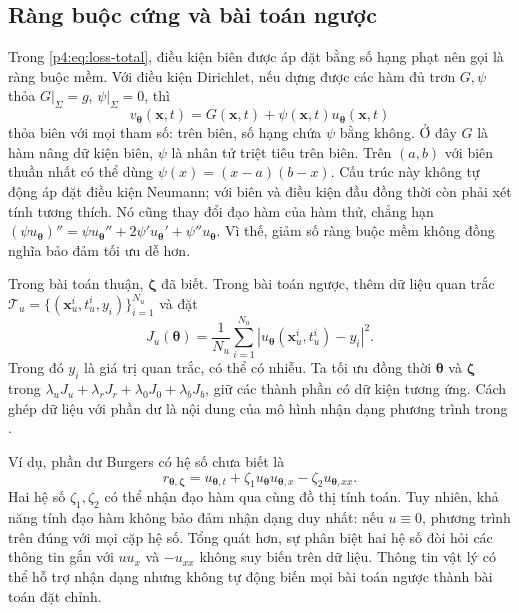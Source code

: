 \subsection{Ràng buộc cứng và bài toán ngược}

Trong \eqref{p4:eq:loss-total}, điều kiện biên được áp đặt bằng số hạng
phạt nên gọi là ràng buộc mềm. Với điều kiện Dirichlet, nếu dựng được
các hàm đủ trơn $G,\psi$ thỏa $G|_\Sigma=g$, $\psi|_\Sigma=0$, thì
\begin{equation}
 v_{\boldsymbol{\theta}}(\mathbf{x},t)
 =G(\mathbf{x},t)+\psi(\mathbf{x},t)u_{\boldsymbol{\theta}}(\mathbf{x},t)
 \label{p4:eq:hard}
\end{equation}
thỏa biên với mọi tham số: trên biên, số hạng chứa $\psi$ bằng không.
Ở đây $G$ là hàm nâng dữ kiện biên, $\psi$ là nhân tử triệt tiêu trên
biên. Trên $(a,b)$ với biên thuần nhất có thể dùng
$\psi(x)=(x-a)(b-x)$. Cấu trúc này không tự động áp đặt điều kiện
Neumann; với biên và điều kiện đầu đồng thời còn phải xét tính tương
thích. Nó cũng thay đổi đạo hàm của hàm thử, chẳng hạn
$(\psi u_{\boldsymbol{\theta}})''=\psi u_{\boldsymbol{\theta}}''+
2\psi'u_{\boldsymbol{\theta}}'+\psi''u_{\boldsymbol{\theta}}$.
Vì thế, giảm số ràng buộc mềm không đồng nghĩa bảo đảm tối ưu dễ hơn.

Trong bài toán thuận, $\boldsymbol{\zeta}$ đã biết. Trong bài toán
ngược, thêm dữ liệu quan trắc
$\mathcal{T}_u=\{(\mathbf{x}_u^i,t_u^i,y_i)\}_{i=1}^{N_u}$ và đặt
\begin{equation}
 J_u(\boldsymbol{\theta})=\frac{1}{N_u}\sum_{i=1}^{N_u}
 |u_{\boldsymbol{\theta}}(\mathbf{x}_u^i,t_u^i)-y_i|^2.
 \label{p4:eq:inverse-data}
\end{equation}
Trong đó $y_i$ là giá trị quan trắc, có thể có nhiễu. Ta tối ưu đồng
thời $\boldsymbol{\theta}$ và $\boldsymbol{\zeta}$ trong
$\lambda_uJ_u+\lambda_rJ_r+\lambda_0J_0+\lambda_bJ_b$, giữ các thành
phần có dữ kiện tương ứng. Cách ghép dữ liệu với phần dư là nội dung
của mô hình nhận dạng phương trình trong
\cite{raissi2019,raissi2017b}.

Ví dụ, phần dư Burgers có hệ số chưa biết là
\begin{equation}
 r_{\boldsymbol{\theta},\boldsymbol{\zeta}}
 =u_{\boldsymbol{\theta},t}+
 \zeta_1u_{\boldsymbol{\theta}}u_{\boldsymbol{\theta},x}
 -\zeta_2u_{\boldsymbol{\theta},xx}.
 \label{p4:eq:inverse-burgers}
\end{equation}
Hai hệ số $\zeta_1,\zeta_2$ có thể nhận đạo hàm qua cùng đồ thị tính
toán. Tuy nhiên, khả năng tính đạo hàm không bảo đảm nhận dạng duy
nhất: nếu $u\equiv0$, phương trình trên đúng với mọi cặp hệ số.
Tổng quát hơn, sự phân biệt hai hệ số đòi hỏi các thông tin gắn với
$u u_x$ và $-u_{xx}$ không suy biến trên dữ liệu. Thông tin vật lý có
thể hỗ trợ nhận dạng nhưng không tự động biến mọi bài toán ngược
thành bài toán đặt chỉnh.

